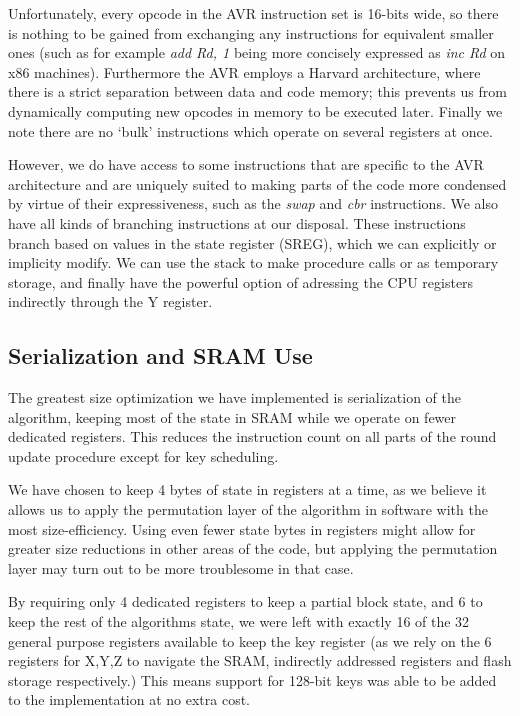 \documentclass[11pt]{llncs2e} %
\begin{document}
Unfortunately, every opcode in the AVR instruction set is 16-bits wide, so there is nothing to be gained from exchanging any instructions for equivalent smaller ones (such as for example \textit{add Rd, 1} being more concisely expressed as \textit{inc Rd} on x86 machines).
Furthermore the AVR employs a Harvard architecture, where there is a strict separation between data and code memory; this prevents us from dynamically computing new opcodes in memory to be executed later.
Finally we note there are no `bulk' instructions which operate on several registers at once.

However, we do have access to some instructions that are specific to the AVR architecture and are uniquely suited to making parts of the code more condensed by virtue of their expressiveness, such as the \textit{swap} and \textit{cbr} instructions.
We also have all kinds of branching instructions at our disposal.
These instructions branch based on values in the state register (SREG), which we can explicitly or implicity modify.
We can use the stack to make procedure calls or as temporary storage, and finally have the powerful option of adressing the CPU registers indirectly through the Y register.

\subsection{Serialization and SRAM Use}
The greatest size optimization we have implemented is serialization of the algorithm, keeping most of the state in SRAM while we operate on fewer dedicated registers.
This reduces the instruction count on all parts of the round update procedure except for key scheduling.

We have chosen to keep 4 bytes of state in registers at a time, as we believe it allows us to apply the permutation layer of the algorithm in software with the most size-efficiency.
Using even fewer state bytes in registers might allow for greater size reductions in other areas of the code, but applying the permutation layer may turn out to be more troublesome in that case.

By requiring only 4 dedicated registers to keep a partial block state, and 6 to keep the rest of the algorithms state, we were left with exactly 16 of the 32 general purpose registers available to keep the key register (as we rely on the 6 registers for X,Y,Z to navigate the SRAM, indirectly addressed registers and flash storage respectively.)
This means support for 128-bit keys was able to be added to the implementation at no extra cost.
\end{document}
